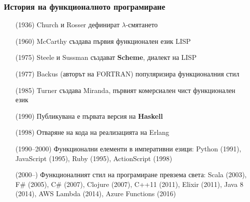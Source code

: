 \documentclass[alsotrans,beameroptions={aspectratio=169}]{beamerswitch}
\begin{document}
\begin{frame}
  \frametitle{История на функционалното програмиране}

  \setlength{\leftmargini}{11ex}
  \begin{itemize}[<+->]
  \item[(1936)] Church и Rosser дефинират $\lambda$-смятането
  \item[(1960)] McCarthy създава първия функционален език LISP
  \item[(1975)] Steele и Sussman създават \textbf{Scheme}, диалект на LISP
  \item[(1977)] Backus (авторът на FORTRAN) популяризира функционалния стил
  \item[(1985)] Turner създава Miranda, първият комерсиален чист функционален език
  \item[(1990)] Публикувана е първата версия на \textbf{Haskell}
  \item[(1998)] Отваряне на кода на реализацията на Erlang
  \item[(1990--2000)] Функционални елементи в императивни езици: Python (1991), JavaScript (1995), Ruby (1995), ActionScript (1998)
  \item[(2000--)] Функционалният стил на програмиране превзема света: Scala (2003), F\# (2005), C\# (2007), Clojure (2007), C++11 (2011), Elixir (2011), Java 8 (2014), AWS Lambda (2014), Azure Functions (2016)
  \end{itemize}
\end{frame}
\end{document}
